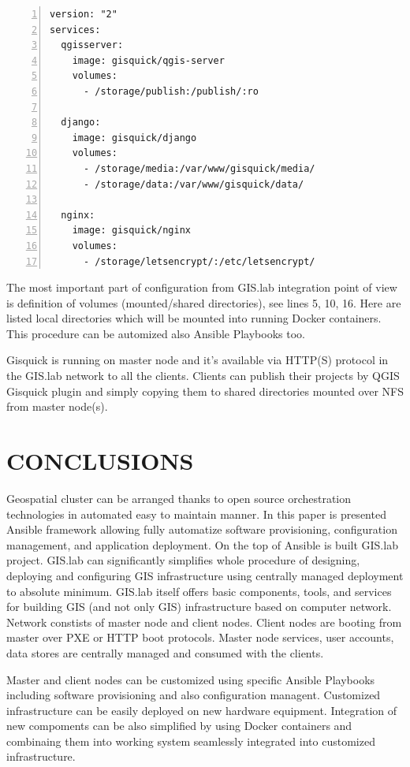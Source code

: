 \documentclass{isprs}
\begin{document}
\begin{lstlisting}[numbers=left,xleftmargin=1em]
version: "2"
services:
  qgisserver:
    image: gisquick/qgis-server
    volumes:
      - /storage/publish:/publish/:ro

  django:
    image: gisquick/django
    volumes:
      - /storage/media:/var/www/gisquick/media/
      - /storage/data:/var/www/gisquick/data/

  nginx:
    image: gisquick/nginx
    volumes:
      - /storage/letsencrypt/:/etc/letsencrypt/
\end{lstlisting}

The most important part of configuration from GIS.lab integration
point of view is definition of volumes (mounted/shared directories),
see lines 5, 10, 16. Here are listed local directories which will be
mounted into running Docker containers. This procedure can be
automized also Ansible Playbooks too.

Gisquick is running on master node and it's available via HTTP(S)
protocol in the GIS.lab network to all the clients. Clients can
publish their projects by QGIS Gisquick plugin and simply copying them
to shared directories mounted over NFS from master node(s).

\section{CONCLUSIONS}

Geospatial cluster can be arranged thanks to open source orchestration
technologies in automated easy to maintain manner. In this paper is
presented Ansible framework allowing fully automatize software
provisioning, configuration management, and application deployment. On
the top of Ansible is built GIS.lab project. GIS.lab can significantly
simplifies whole procedure of designing, deploying and configuring GIS
infrastructure using centrally managed deployment to absolute
minimum. GIS.lab itself offers basic components, tools, and services
for building GIS (and not only GIS) infrastructure based on computer
network. Network constists of master node and client nodes. Client
nodes are booting from master over PXE or HTTP boot protocols. Master
node services, user accounts, data stores are centrally managed and
consumed with the clients. 

Master and client nodes can be customized using specific Ansible
Playbooks including software provisioning and also configuration
managent. Customized infrastructure can be easily deployed on new
hardware equipment. Integration of new compoments can be also
simplified by using Docker containers and combinaing them into working
system seamlessly integrated into customized infrastructure. 
\end{document}
